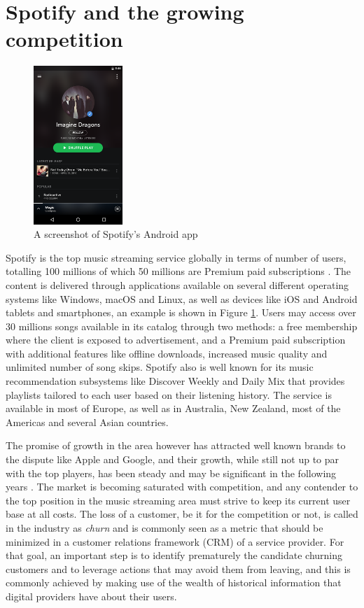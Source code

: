 \documentclass{kththesis}
\begin{document}
	\section{Spotify and the growing competition}	
	
	\begin{figure}[h]
    \centering
    \includegraphics[width=0.3\textwidth, natwidth=506bp, natheight=900bp]{figures/spotify_screenshot.png}
    \caption{A screenshot of Spotify's Android app}
    \label{fig:spotify-screenshot}
\end{figure}
		
	Spotify is the top music streaming service globally in terms of number of users, totalling 100 millions of which 50 millions are Premium paid subscriptions \citep{spotifypress}. The content is delivered through applications available on several different operating systems like Windows, macOS and Linux, as well as devices like iOS and Android tablets and smartphones, an example is shown in Figure \ref{fig:spotify-screenshot}. Users may access over 30 millions songs available in its catalog through two methods: a free membership where the client is exposed to advertisement, and a Premium paid subscription with additional features like offline downloads, increased music quality and unlimited number of song skips. Spotify also is well known for its music recommendation subsystems like Discover Weekly and Daily Mix that provides playlists tailored to each user based on their listening history. The service is available in most of Europe, as well as in Australia, New Zealand, most of the Americas and several Asian countries.	
	
	The promise of growth in the area however has attracted well known brands to the dispute like Apple and Google, and their growth, while still not up to par with the top players, has been steady and may be significant in the following years \citep{ifpi}. The market is becoming saturated with competition, and any contender to the top position in the music streaming area must strive to keep its current user base at all costs. The loss of a customer, be it for the competition or not, is called in the industry as \emph{churn} and is commonly seen as a metric that should be minimized in a customer relations framework (CRM) of a service provider. For that goal, an important step is to identify prematurely the candidate churning customers and to leverage actions that may avoid them from leaving, and this is commonly achieved by making use of the wealth of historical information that digital providers have about their users. 
	
\end{document}
